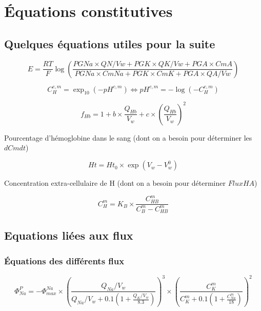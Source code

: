 \documentclass[a4paper,fleqn]{article}
\begin{document}
\section{Équations constitutives}

\subsection{Quelques équations utiles pour la suite}

\begin{equation}
E =  \frac{RT}{F}\log{\left(\frac{{PGNa}\times{QN}/Vw + {PGK}\times{QK/Vw} + {PGA}\times{CmA}}{{PGNa}\times{CmNa} + {PGK}\times{CmK} + {PGA}\times{QA/Vw}}\right)}
\end{equation}

\begin{equation}
{C_{H}^{c,m}=\exp_{10}{\left(-pH^{c,m}\right)}}\Longleftrightarrow{pH^{c,m}=-\log{\left(-C_{H}^{c,m}\right)}}
\end{equation}

\begin{equation}
f_{Hb}=1+{b}\times{\frac{Q_{Hb}}{V_w }}+{c}\times{\left(\frac{Q_{Hb}}{V_w }\right)^2}
\end{equation}

Pourcentage d'hémoglobine dans le sang (dont on a besoin pour déterminer les $dCmdt$)

\begin{equation}
Ht = {Ht_0}\times{\exp{(V_w-V_w^0)}}
\end{equation}

Concentration extra-cellulaire de H (dont on a besoin pour déterminer $FluxHA$)

\begin{equation}
C_{H}^{m}={K_B}\times{\frac{C_{HB}^{m}}{C_{B}^{m}-C_{HB}^{m}}}
\end{equation}

\subsection{Equations liées aux flux}
\subsubsection*{Équations des différents flux}

\begin{equation}
\Phi_{Na}^{P}={-\Phi_{max}^{Na}}\times{\left(\frac{Q_{Na}/V_w}{Q_{Na}/V_w+0.1\left(1+\frac{Q_{K}/V_w}{8.3}\right)}\right)^3}\times{\left(\frac{C_{K}^{m}}{C_{K}^{m}+0.1\left(1+\frac{C_{Na}^{m}}{18}\right)}\right)^2}
\end{equation}
\end{document}
